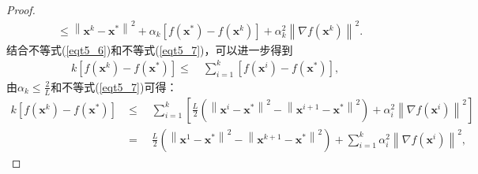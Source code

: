 \begin{proof}
\begin{equation}
\begin{split}
        &\leq\left\|\bm{x}^{k}-\bm{x}^{*}\right\|^{2}+\alpha_{k}\left[f\left(\bm{x}^{*}\right)-f\left(\bm{x}^{k}\right)\right]+\alpha_{k}^{2}\left\|\nabla f\left(\bm{x}^{k}\right)\right\|^{2} .
        \end{split}
        \label{eqt5_7}
    \end{equation}
    结合不等式(\ref{eqt5_6})和不等式(\ref{eqt5_7})，可以进一步得到
    \begin{equation}
        \begin{split}
        k\left[f\left(\bm{x}^{k}\right)-f\left(\bm{x}^{*}\right)\right]
        \leq \quad \sum_{i=1}^{k}\left[f\left(\bm{x}^{i}\right)-f\left(\bm{x}^{*}\right)\right] ,
        \end{split}
        \nonumber
    \end{equation}
    由$\alpha_{k} \leq \frac{2}{L}$和不等式(\ref{eqt5_7})可得：
    \begin{equation}
        \begin{split}
        k\left[f\left(\bm{x}^{k}\right)-f\left(\bm{x}^{*}\right)\right] &\leq \quad \sum_{i=1}^{k}\left[\frac{L}{2}\left(\left\|\bm{x}^{i}-\bm{x}^{*}\right\|^{2}-\left\|\bm{x}^{i+1}-\bm{x}^{*}\right\|^{2}\right)+\alpha_{i}^{2}\left\|\nabla f\left(\bm{x}^{i}\right)\right\|^{2}\right] \\
        &=\quad \frac{L}{2}\left(\left\|\bm{x}^{1}-\bm{x}^{*}\right\|^{2}-\left\|\bm{x}^{k+1}-\bm{x}^{*}\right\|^{2}\right)+\sum_{i=1}^{k} \alpha_{i}^{2}\left\|\nabla f\left(\bm{x}^{i}\right)\right\|^{2} ,

\end{split}
\end{equation}
\end{proof}
